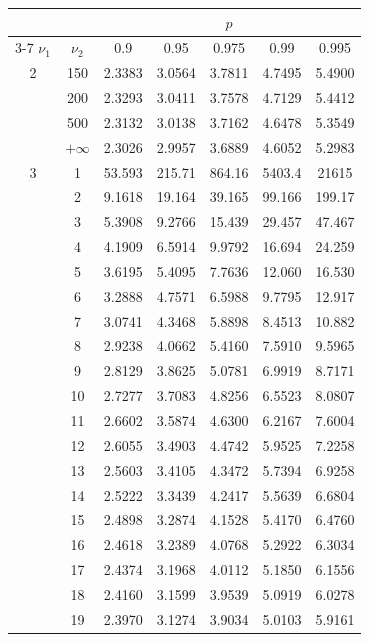 \newpage
\noindent
\begin{minipage}{0.49\textwidth}
	\begin{center}
		\begin{tabular}{ccccccc}
			& & \multicolumn{5}{c}{$p$}\\
			\cline{3-7}
			$\nu_1$ & $\nu_2$ & 0.9 & 0.95 & 0.975 & 0.99 & 0.995 \\
			\midrule
			2 & 150 & 2.3383 & 3.0564 & 3.7811 & 4.7495 & 5.4900 \\
			& 200 & 2.3293 & 3.0411 & 3.7578 & 4.7129 & 5.4412 \\
			& 500 & 2.3132 & 3.0138 & 3.7162 & 4.6478 & 5.3549 \\
			& $+\infty$ & 2.3026 & 2.9957 & 3.6889 & 4.6052 & 5.2983 \\
			\midrule
			3 & 1 & 53.593 & 215.71 & 864.16 & 5403.4 & 21615 \\
			& 2 & 9.1618 & 19.164 & 39.165 & 99.166 & 199.17 \\
			& 3 & 5.3908 & 9.2766 & 15.439 & 29.457 & 47.467 \\
			& 4 & 4.1909 & 6.5914 & 9.9792 & 16.694 & 24.259 \\
			& 5 & 3.6195 & 5.4095 & 7.7636 & 12.060 & 16.530 \\
			& 6 & 3.2888 & 4.7571 & 6.5988 & 9.7795 & 12.917 \\
			& 7 & 3.0741 & 4.3468 & 5.8898 & 8.4513 & 10.882 \\
			& 8 & 2.9238 & 4.0662 & 5.4160 & 7.5910 & 9.5965 \\
			& 9 & 2.8129 & 3.8625 & 5.0781 & 6.9919 & 8.7171 \\[5pt]
			& 10 & 2.7277 & 3.7083 & 4.8256 & 6.5523 & 8.0807 \\
			& 11 & 2.6602 & 3.5874 & 4.6300 & 6.2167 & 7.6004 \\
			& 12 & 2.6055 & 3.4903 & 4.4742 & 5.9525 & 7.2258 \\
			& 13 & 2.5603 & 3.4105 & 4.3472 & 5.7394 & 6.9258 \\
			& 14 & 2.5222 & 3.3439 & 4.2417 & 5.5639 & 6.6804 \\
			& 15 & 2.4898 & 3.2874 & 4.1528 & 5.4170 & 6.4760 \\
			& 16 & 2.4618 & 3.2389 & 4.0768 & 5.2922 & 6.3034 \\
			& 17 & 2.4374 & 3.1968 & 4.0112 & 5.1850 & 6.1556 \\
			& 18 & 2.4160 & 3.1599 & 3.9539 & 5.0919 & 6.0278 \\
			& 19 & 2.3970 & 3.1274 & 3.9034 & 5.0103 & 5.9161 \\[5pt]

\end{tabular}
\end{center}
\end{minipage}
